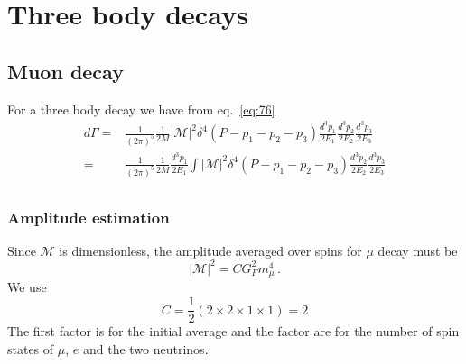 \chapter{Three body decays}
\label{cha:three-body-decays} %

\section{Muon decay}
\label{sec:mu-decay} 

For a three body decay we have from eq.~\eqref{eq:76}
\begin{align}
  \label{eq:107}
  d\Gamma =& \frac{1}{(2\pi)^5}\frac{1}{2M}\left|\mathcal{M}\right|^2 \delta^4(P-p_1-p_2-p_3)\frac{d^3 p_1}{2E_1}
\frac{d^3 p_2}{2E_2}\frac{d^3 p_3}{2E_3}\nonumber\\
  =& \frac{1}{(2\pi)^5}\frac{1}{2M}\frac{d^3 p_1}{2E_1}\int\left|\mathcal{M}\right|^2 \delta^4(P-p_1-p_2-p_3)
\frac{d^3 p_2}{2E_2}\frac{d^3 p_3}{2E_3}\nonumber\\
\end{align}

\subsection{Amplitude estimation}
\label{sec:amplitude-estimation}
Since $\mathcal{M}$ is dimensionless, the amplitude averaged over spins for $\mu$ decay must be
\begin{equation}
  |\mathcal{M}|^2=C G_F^2 m_\mu^4\,.
\end{equation}
We use
\begin{equation}
  C=\frac{1}{2}(2\times2\times1\times1)=2
\end{equation}
The first factor is for the initial average and the factor are for the number of spin states of $\mu$, $e$ and the two neutrinos. 


